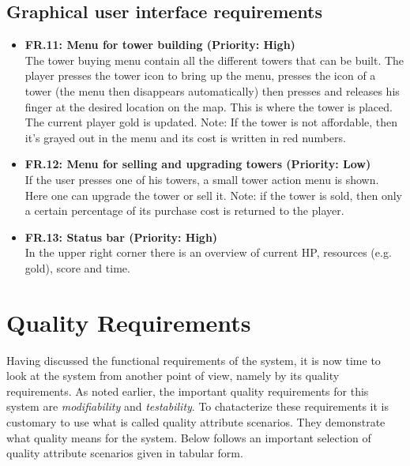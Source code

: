\documentclass[11pt,a4paper]{article}
\begin{document}
\subsection{Graphical user interface requirements}
\begin{itemize}
\item \textbf{FR.11: Menu for tower building (Priority: High)}\\ The tower buying menu contain all the different towers that can be built. The player presses the tower icon to bring up the menu, presses the icon of a tower (the menu then disappears automatically) then presses and releases his finger at the desired location on the map. This is where the tower is placed. The current player gold is updated. Note: If the tower is not affordable, then it's grayed out in the menu  and its cost is written in red numbers.
\item \textbf{FR.12: Menu for selling and upgrading towers (Priority: Low)}\\ If the user presses one of his towers, a small tower action menu is shown. Here one can upgrade the tower or sell it. Note: if the tower is sold, then only a certain percentage of its purchase cost is returned to the player.
\item \textbf{FR.13: Status bar (Priority: High)}\\ In the upper right corner there is an overview of current HP, resources (e.g. gold), score and time.
\end{itemize}

\clearpage

\section{Quality Requirements}
Having discussed the functional requirements of the system, it is now time to look at the system from another point of view, namely by its quality requirements. As noted earlier, the important quality requirements for this system are \textit{modifiability} and \textit{testability}. To chatacterize these requirements it is customary to use what is called quality attribute scenarios. They demonstrate what quality means for the system. Below follows an important selection of quality attribute scenarios given in tabular form. \\

\end{document}
